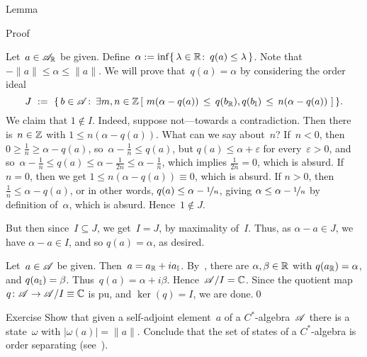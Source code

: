 \documentclass[a]{subfiles}
\begin{document}
\begin{parsec}
\begin{point}{Lemma}
\begin{point}{Proof}
\begin{point}%
Let~$a\in \mathscr{A}_{\mathbb{R}}$ be given.
Define~$\alpha := \inf\{\,\lambda\in\mathbb{R}\colon\, q(a)\leq \lambda\,\}$.
Note that $-\|a\| \leq \alpha\leq \|a\|$.
We will prove that~$q(a)=\alpha$
by considering the order ideal
\begin{equation*}
J\ := \ \{\,b\in \scrA\colon\, \exists m,n\in \Z\,[\ 
m(\alpha-q(a)) \,\leq\, q(\Real{b}),q(\Imag{b})\,\leq\, n(\alpha-q(a))\ ]\,\}.
\end{equation*}
We claim that $1\notin I$.
Indeed, suppose not---towards a contradiction.
Then there is~$n\in \mathbb{Z}$
with $1\leq n(\alpha-q(a))$.
What can we say about~$n$?
If~$n<0$,
then $0\geq \frac{1}{n}\geq \alpha-q(a)$,
so~$\alpha-\frac{1}{n} \leq q(a)$,
but $q(a)\leq \alpha+\varepsilon$
for every~$\varepsilon>0$,
and so~$\alpha-\frac{1}{n}\leq q(a)\leq \alpha-\frac{1}{2n}
\leq \alpha-\frac{1}{n}$,
which implies $\frac{1}{2n}=0$,
which is absurd.
If $n=0$,
then we get $1\leq n(\alpha-q(a))\equiv 0$, which is absurd.
If $n> 0$,
then $\frac{1}{n}\leq \alpha-q(a)$,
or in other words,
 $q(a) \leq \alpha - \nicefrac{1}{n}$,
giving $\alpha \leq \alpha-\nicefrac{1}{n}$
by definition of~$\alpha$,
which is absurd.
Hence~$1\notin J$.

But then since~$I\subseteq J$,
we get~$I=J$, by maximality of~$I$.
Thus, as $\alpha-a\in J$, we have $\alpha-a\in I$,
and so $q(a)=\alpha$, as desired.
\end{point}
\begin{point}%
Let~$a\in \mathscr{A}$ be given.
Then~$a=a_{\mathbb{R}}+ia_{\mathbb{I}}$.
By~,
there are $\alpha,\beta\in \mathbb{R}$ with $q(a_{\mathbb{R}})=\alpha$,
and $q(a_{\mathbb{I}})=\beta$.
Thus~$q(a)=\alpha+i\beta$.
Hence~$\mathscr{A}/I=\mathbb{C}$.
Since the quotient map $q\colon \mathscr{A}\to \mathscr{A}/I\equiv \mathbb{C}$
is pu, and $\ker(q)=I$, we are done.\qed
\end{point}
\end{point}
\begin{point}[states-order-separating]{Exercise}%
Show that given a self-adjoint element~$a$
of a $C^*$-algebra~$\mathscr{A}$
there is a state~$\omega$ with $\left|\omega (a)\right| = \|a\|$.
Conclude that the set of states of a $C^*$-algebra
is order separating (see~).
\end{point}
\end{point}
\end{parsec}
\end{document}
